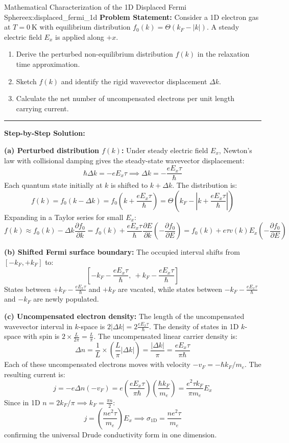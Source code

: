 \documentclass[11pt,a4paper]{article}
\begin{document}
\begin{examplebox}{Mathematical Characterization of the 1D Displaced Fermi Sphere}{ex:displaced_fermi_1d}
\textbf{Problem Statement:}
Consider a 1D electron gas at $T = 0\ \mathrm{K}$ with equilibrium distribution $f_0(k) = \Theta(k_F - |k|)$. A steady electric field $E_x$ is applied along $+x$.
\begin{enumerate}[label=(\alph*)]
    \item Derive the perturbed non-equilibrium distribution $f(k)$ in the relaxation time approximation.
    \item Sketch $f(k)$ and identify the rigid wavevector displacement $\Delta k$.
    \item Calculate the net number of uncompensated electrons per unit length carrying current.
\end{enumerate}

\vspace{0.2cm}\hrule\vspace{0.2cm}
\textbf{Step-by-Step Solution:}

\textbf{(a) Perturbed distribution $f(k)$:}
Under steady electric field $E_x$, Newton's law with collisional damping gives the steady-state wavevector displacement:
\[
\hbar \Delta k = -e E_x \tau \implies \Delta k = -\frac{e E_x \tau}{\hbar}
\]
Each quantum state initially at $k$ is shifted to $k + \Delta k$. The distribution is:
\[
f(k) = f_0(k - \Delta k) = f_0\left(k + \frac{e E_x \tau}{\hbar}\right) = \Theta\left( k_F - \left| k + \frac{e E_x \tau}{\hbar} \right| \right)
\]
Expanding in a Taylor series for small $E_x$:
\[
f(k) \approx f_0(k) - \Delta k \frac{\partial f_0}{\partial k} = f_0(k) + \frac{e E_x \tau}{\hbar}\frac{\partial E}{\partial k}\left(-\frac{\partial f_0}{\partial E}\right) = f_0(k) + e\tau v(k) E_x \left(-\frac{\partial f_0}{\partial E}\right)
\]

\textbf{(b) Shifted Fermi surface boundary:}
The occupied interval shifts from $[-k_F, +k_F]$ to:
\[
\left[ -k_F - \frac{e E_x \tau}{\hbar},\ +k_F - \frac{e E_x \tau}{\hbar} \right]
\]
States between $+k_F - \frac{eE_x\tau}{\hbar}$ and $+k_F$ are vacated, while states between $-k_F - \frac{eE_x\tau}{\hbar}$ and $-k_F$ are newly populated.

\textbf{(c) Uncompensated electron density:}
The length of the uncompensated wavevector interval in $k$-space is $2|\Delta k| = 2\frac{e E_x \tau}{\hbar}$.
The density of states in 1D $k$-space with spin is $2 \times \frac{L}{2\pi} = \frac{L}{\pi}$. The uncompensated linear carrier density is:
\[
\Delta n = \frac{1}{L} \times \left( \frac{L}{\pi} |\Delta k| \right) = \frac{|\Delta k|}{\pi} = \frac{e E_x \tau}{\pi \hbar}
\]
Each of these uncompensated electrons moves with velocity $-v_F = -\hbar k_F/m_e$. The resulting current is:
\[
j = -e \Delta n (-v_F) = e \left(\frac{e E_x \tau}{\pi \hbar}\right)\left(\frac{\hbar k_F}{m_e}\right) = \frac{e^2 \tau k_F}{\pi m_e} E_x
\]
Since in 1D $n = 2 k_F / \pi \implies k_F = \frac{\pi n}{2}$:
\[
j = \left(\frac{n e^2 \tau}{m_e}\right)E_x \implies \sigma_{\mathrm{1D}} = \frac{n e^2 \tau}{m_e}
\]
confirming the universal Drude conductivity form in one dimension.
\end{examplebox}
\end{document}
